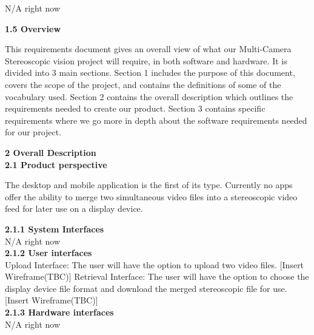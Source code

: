 \documentclass[10pt,draftclsnofoot,onecolumn]{IEEEtran}
\begin{document}
N/A right now
\\
\vspace{5mm}


{\Medium\textbf{1.5 Overview}}\\
\vspace{5mm}

This requirements document gives an overall view of what our Multi-Camera Stereoscopic vision project will require, in both software and hardware. It is divided into 3 main sections. Section 1 includes the purpose of this document, covers the scope of the project, and contains the definitions of some of the vocabulary used. Section 2 contains the overall description which outlines the requirements needed to create our product. Section 3 contains specific requirements where we go more in depth about the software requirements needed for our project. 
\\
\vspace{5mm}

{\Large\textbf{2 Overall Description}} \\
\vspace{5mm}
{\Medium\textbf{2.1 Product perspective}} \\
\vspace{5mm}

The desktop and mobile application is the first of its type. Currently no apps offer the ability to merge two simultaneous video files into a stereoscopic video feed for later use on a display device. \vspace{5mm}

{\Medium\textbf{2.1.1 System Interfaces}} \\
\vspace{5mm}
N/A right now\\
\vspace{5mm}
{\Medium\textbf{2.1.2 User interfaces}} \\

\vspace{5mm}
Upload Interface: The user will have the option to upload two video files.
				[Insert Wireframe(TBC)]
Retrieval Interface: The user will have the option to choose the display device file format and download the merged stereoscopic file for use.
[Insert Wireframe(TBC)]\\
\vspace{5mm}
{\Medium\textbf{2.1.3 Hardware interfaces}} \\

\vspace{5mm}
N/A right now
\vspace{5mm}
\end{document}
